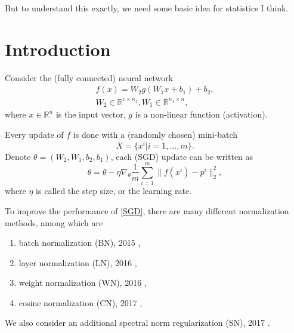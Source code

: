 But to understand this exactly, we need some basic idea for statistics I think.

%

\section{Introduction}
Consider the (fully connected) neural network 
\begin{equation}\label{nn}
\begin{aligned}
f(x)=W_2g(W_1x+b_1)+b_2,\\ 
W_2\in\mathbb{R}^{c\times n_1},
W_1\in\mathbb{R}^{n_1\times n},
\end{aligned}
\end{equation}
where $x\in\mathbb{R}^n$ is the input vector, $g$ is a non-linear function (activation). 

Every update of $f$ is done with a (randomly chosen) mini-batch \[X=\{x^i|i=1,...,m\}.\]
Denote $\theta=(W_2,W_1,b_2,b_1)$, each (SGD) update can be written as
\begin{equation}\label{SGD}
\theta=\theta-\eta\nabla_\theta \frac{1}{m}\sum_{i=1}^m\|f(x^i)-p^i\|_2^2,
\end{equation}
where $\eta$ is called the step size, or the learning rate.

To improve the performance of \eqref{SGD}, there are many different normalization methods, among which are
\begin{enumerate}
	\item batch normalization (BN), 2015 \cite{ioffe2015batch},
	\item layer normalization (LN), 2016 \cite{2016arXiv160706450L},
	\item weight normalization (WN), 2016 \cite{2016arXiv160207868S},
	\item cosine normalization (CN), 2017 \cite{2017arXiv170205870L},
\end{enumerate}
We also consider an additional spectral norm regularization (SN), 2017 \cite{2017arXiv170510941Y}.

